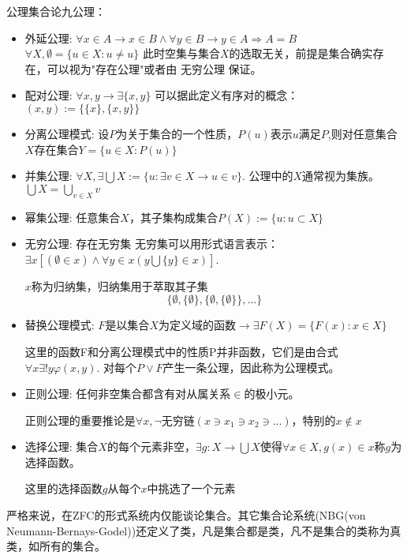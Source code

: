     公理集合论九公理：
    \begin{itemize}
        \item 外延公理: $\forall x \in A \rightarrow  x \in B \wedge \forall y \in B\rightarrow  y \in A \Rightarrow A=B$
        $\forall X,\emptyset =\{u\in X : u \neq u\}$ 此时空集与集合$X$的选取无关，前提是集合确实存在，可以视为"存在公理"或者由 无穷公理 保证。
        \item 配对公理: $\forall x,y\rightarrow \exists \{x,y\}$
        可以据此定义有序对的概念：$(x,y):=\{\{x\},\{x,y\}\}$
        \item 分离公理模式: 设$P$为关于集合的一个性质，$P(u)$表示$u$满足$P$,则对任意集合$X$存在集合$Y=\{u\in X: P(u)\}$
        \item 并集公理: $\forall X, \exists \bigcup X:=\{u:\exists v\in X\rightarrow u\in v\}$.
        公理中的$X$通常视为集族。 $\bigcup X=\bigcup_{v\in X} v$
        \item 幂集公理: 任意集合$X$，其子集构成集合$P(X):=\{u:u \subset X\}$
        \item 无穷公理: 存在无穷集
        无穷集可以用形式语言表示：$\exists x[(\emptyset \in x) \wedge \forall y\in x(y\bigcup\{y\}\in x)]$.

        $x$称为归纳集，归纳集用于萃取其子集
        $$
        \{
            \emptyset,
            \{
                \emptyset
            \},
            \{
                \emptyset,
                \{
                    \emptyset 
                \}
            \}
            ,
            ... 
        \}
        $$
        \item 替换公理模式: $F$是以集合$X$为定义域的函数$\rightarrow \exists F(X)=\{F(x):x\in X\}$
        
        这里的函数F和分离公理模式中的性质P并非函数，它们是由合式$\forall x\exists !y \varphi(x,y)$. 对每个$P \vee F$产生一条公理，因此称为公理模式。
        \item 正则公理: 任何非空集合都含有对从属关系$\in$的极小元。
        
        正则公理的重要推论是$\forall x,\lnot$无穷链$(x \ni x_1 \ni x_2 \ni ...)$，特别的$x \notin x$

        \item 选择公理: 集合$X$的每个元素非空，$\exists g:X\rightarrow \bigcup X$使得$\forall x \in X, g(x)\in x$称$g$为选择函数。\label{Axiom of Choose}
        
        这里的选择函数$g$从每个$x$中挑选了一个元素
    \end{itemize}
    严格来说，在ZFC的形式系统内仅能谈论集合。其它集合论系统(NBG(von Neumann-Bernays-Godel))还定义了类，凡是集合都是类，凡不是集合的类称为\space 真类，如所有的集合。

